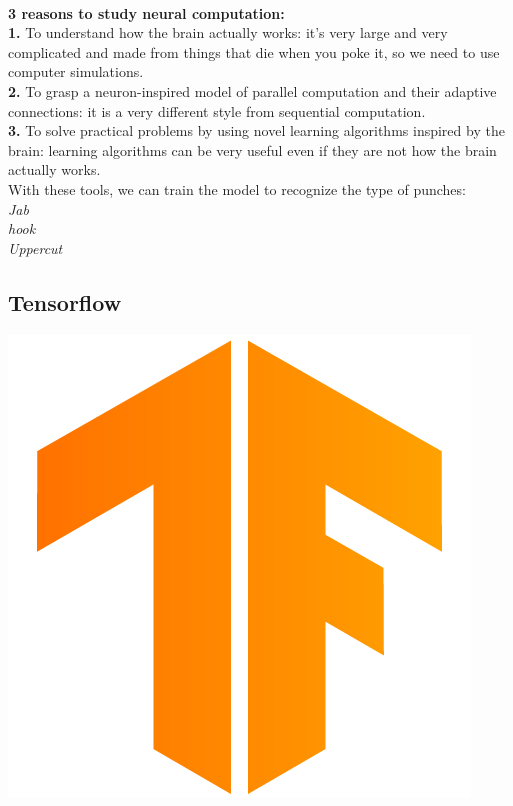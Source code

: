 \documentclass[a4paper,12pt]{report}
\begin{document}
\\
\textbf{3 reasons to study neural computation:}\\
\textbf{1.} To understand how the brain actually works: it's very large and very complicated and made from things that die when you poke it, so we need to use computer simulations.\\
\textbf{2.} To grasp a neuron-inspired model of parallel computation and their adaptive connections: it is a very different style from sequential computation.\\
\textbf{3.} To solve practical problems by using novel learning algorithms inspired by the brain: learning algorithms can be very useful even if they are not how the brain actually works.
\\
With these tools, we can train the model to recognize the type of punches:\\
\textit{Jab\\hook\\Uppercut}
\subsection{Tensorflow}
\includegraphics[scale=.04]{images/tensorflow.png}
\end{document}
